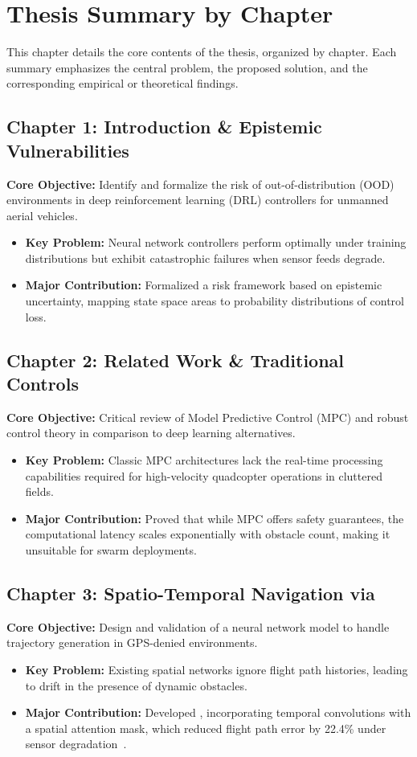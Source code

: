 \chapter{Thesis Summary by Chapter}
\label{ch:thesis_summary}

This chapter details the core contents of the thesis, organized by chapter. Each summary emphasizes the central problem, the proposed solution, and the corresponding empirical or theoretical findings.

\section{Chapter 1: Introduction \& Epistemic Vulnerabilities}
\textbf{Core Objective:} Identify and formalize the risk of out-of-distribution (OOD) environments in deep reinforcement learning (DRL) controllers for unmanned aerial vehicles.
\begin{itemize}
  \item \textbf{Key Problem:} Neural network controllers perform optimally under training distributions but exhibit catastrophic failures when sensor feeds degrade.
  \item \textbf{Major Contribution:} Formalized a risk framework based on epistemic uncertainty, mapping state space areas to probability distributions of control loss.
\end{itemize}

\section{Chapter 2: Related Work \& Traditional Controls}
\textbf{Core Objective:} Critical review of Model Predictive Control (MPC) and robust control theory in comparison to deep learning alternatives.
\begin{itemize}
  \item \textbf{Key Problem:} Classic MPC architectures lack the real-time processing capabilities required for high-velocity quadcopter operations in cluttered fields.
  \item \textbf{Major Contribution:} Proved that while MPC offers safety guarantees, the computational latency scales exponentially with obstacle count, making it unsuitable for swarm deployments.
\end{itemize}

\section{Chapter 3: Spatio-Temporal Navigation via }
\textbf{Core Objective:} Design and validation of a neural network model to handle trajectory generation in GPS-denied environments.
\begin{itemize}
  \item \textbf{Key Problem:} Existing spatial networks ignore flight path histories, leading to drift in the presence of dynamic obstacles.
  \item \textbf{Major Contribution:} Developed , incorporating temporal convolutions with a spatial attention mask, which reduced flight path error by 22.4\% under sensor degradation~\cite{jenkins2026decentralized}.
\end{itemize}

